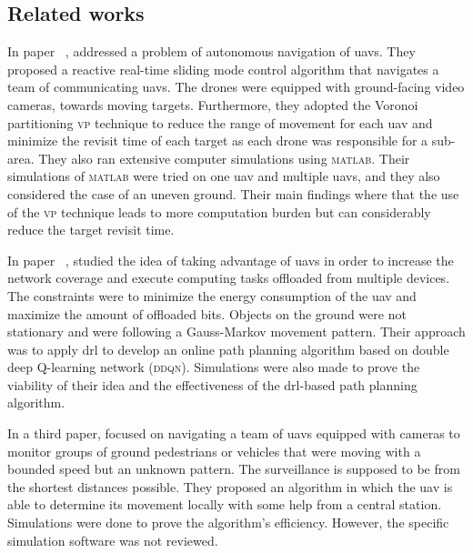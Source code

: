 \documentclass[../main.tex]{subfiles}
\begin{document}


\subsection{Related works}\label{sec:related-work}

In paper ~\cite{hua20}, \citeauthor{hua20} 
addressed a problem of autonomous navigation of \glspl{uav}. 
They proposed a reactive real-time sliding mode control algorithm 
that navigates a team of communicating \glspl{uav}.
The drones were equipped with ground-facing video cameras,
towards moving targets. 
Furthermore, they adopted the Voronoi partitioning \textsc{vp} technique 
to reduce the range of movement for each \gls{uav} and 
minimize the revisit time of each target as each drone was responsible 
for a sub-area.
They also ran extensive computer simulations using \textsc{matlab}. 
Their simulations of \textsc{matlab} were tried on one \gls{uav} and multiple \glspl{uav},
and they also considered the case of an uneven ground. 
Their main findings where that the use of the \textsc{vp} technique 
leads to more computation burden but can considerably reduce the target 
revisit time.


In paper ~\cite{pen21}, \citeauthor{pen21} studied the idea 
of taking advantage of \glspl{uav} in order to increase the network
coverage and execute computing tasks offloaded from multiple devices. 
The constraints were to minimize the energy consumption of the \gls{uav} 
and maximize the amount of offloaded bits. 
Objects on the ground were not stationary and were following a Gauss-Markov 
movement pattern. Their approach was to apply \gls{drl} to develop an online path planning algorithm based on double deep Q-learning network (\textsc{ddqn}).
Simulations were also made to prove the viability of their idea and the 
effectiveness of the \gls{drl}-based path planning algorithm.

In a third paper, \citeauthor{hua21} focused on navigating a team
of \glspl{uav} equipped with cameras to monitor groups of ground 
pedestrians or vehicles that were moving with a bounded speed but an unknown pattern. 
The surveillance is supposed to be from the shortest distances possible. 
They proposed an algorithm in which the \gls{uav} is able to determine 
its movement locally with some help from a central station.
Simulations were done to prove the algorithm's efficiency. However, the 
specific simulation software was not reviewed. 
\end{document}
